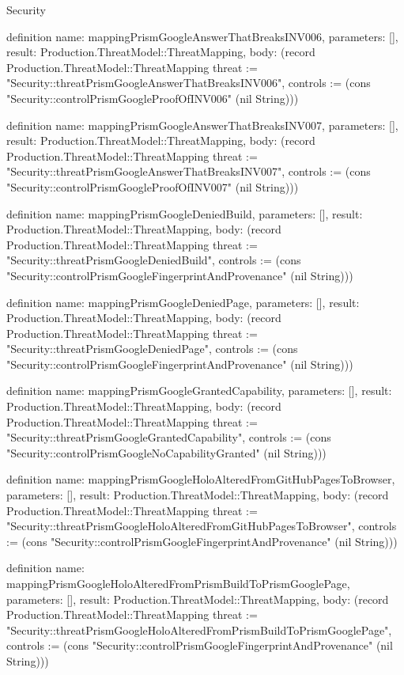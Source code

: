 \begin{lexlean}{Security}
\begin{semanticmodule}
definition{
  name: mappingPrismGoogleAnswerThatBreaksINV006,
  parameters: [],
  result: Production.ThreatModel::ThreatMapping,
  body: (record Production.ThreatModel::ThreatMapping {threat := "Security::threatPrismGoogleAnswerThatBreaksINV006", controls := (cons "Security::controlPrismGoogleProofOfINV006" (nil String))})
}

definition{
  name: mappingPrismGoogleAnswerThatBreaksINV007,
  parameters: [],
  result: Production.ThreatModel::ThreatMapping,
  body: (record Production.ThreatModel::ThreatMapping {threat := "Security::threatPrismGoogleAnswerThatBreaksINV007", controls := (cons "Security::controlPrismGoogleProofOfINV007" (nil String))})
}

definition{
  name: mappingPrismGoogleDeniedBuild,
  parameters: [],
  result: Production.ThreatModel::ThreatMapping,
  body: (record Production.ThreatModel::ThreatMapping {threat := "Security::threatPrismGoogleDeniedBuild", controls := (cons "Security::controlPrismGoogleFingerprintAndProvenance" (nil String))})
}

definition{
  name: mappingPrismGoogleDeniedPage,
  parameters: [],
  result: Production.ThreatModel::ThreatMapping,
  body: (record Production.ThreatModel::ThreatMapping {threat := "Security::threatPrismGoogleDeniedPage", controls := (cons "Security::controlPrismGoogleFingerprintAndProvenance" (nil String))})
}

definition{
  name: mappingPrismGoogleGrantedCapability,
  parameters: [],
  result: Production.ThreatModel::ThreatMapping,
  body: (record Production.ThreatModel::ThreatMapping {threat := "Security::threatPrismGoogleGrantedCapability", controls := (cons "Security::controlPrismGoogleNoCapabilityGranted" (nil String))})
}

definition{
  name: mappingPrismGoogleHoloAlteredFromGitHubPagesToBrowser,
  parameters: [],
  result: Production.ThreatModel::ThreatMapping,
  body: (record Production.ThreatModel::ThreatMapping {threat := "Security::threatPrismGoogleHoloAlteredFromGitHubPagesToBrowser", controls := (cons "Security::controlPrismGoogleFingerprintAndProvenance" (nil String))})
}

definition{
  name: mappingPrismGoogleHoloAlteredFromPrismBuildToPrismGooglePage,
  parameters: [],
  result: Production.ThreatModel::ThreatMapping,
  body: (record Production.ThreatModel::ThreatMapping {threat := "Security::threatPrismGoogleHoloAlteredFromPrismBuildToPrismGooglePage", controls := (cons "Security::controlPrismGoogleFingerprintAndProvenance" (nil String))})
}


\end{semanticmodule}
\end{lexlean}

